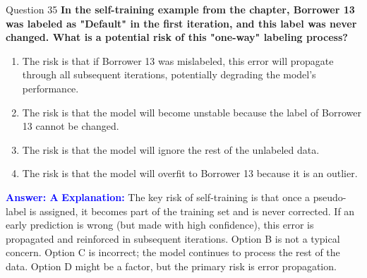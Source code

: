 \documentclass{beamer}
\begin{document}
	\begin{frame}{Question 35}
		\textbf{In the self-training example from the chapter, Borrower 13 was labeled as "Default" in the first iteration, and this label was never changed. What is a potential risk of this "one-way" labeling process?}
		\begin{enumerate}
			\item The risk is that if Borrower 13 was mislabeled, this error will propagate through all subsequent iterations, potentially degrading the model's performance.
			\item The risk is that the model will become unstable because the label of Borrower 13 cannot be changed.
			\item The risk is that the model will ignore the rest of the unlabeled data.
			\item The risk is that the model will overfit to Borrower 13 because it is an outlier.
		\end{enumerate}
		\vspace{0.2cm}
		\textcolor{blue}{\textbf{Answer: A}}
		\vspace{0.2cm}
		\textcolor{blue}{\textbf{Explanation:}} The key risk of self-training is that once a pseudo-label is assigned, it becomes part of the training set and is never corrected. If an early prediction is wrong (but made with high confidence), this error is propagated and reinforced in subsequent iterations. Option B is not a typical concern. Option C is incorrect; the model continues to process the rest of the data. Option D might be a factor, but the primary risk is error propagation.
	\end{frame}
	
\end{document}
